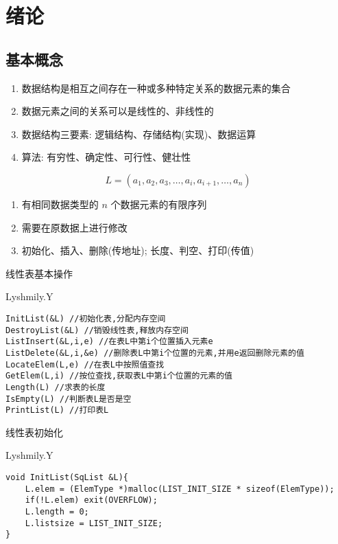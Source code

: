 \chapter{绪论}
\section{基本概念}
\begin{definition}[数据结构]
    \begin{enumerate}
        \item 数据结构是相互之间存在一种或多种特定关系的数据元素的集合
        \item 数据元素之间的关系可以是线性的、非线性的
        \item 数据结构三要素: 逻辑结构、存储结构(实现)、数据运算
        \item 算法: 有穷性、确定性、可行性、健壮性
    \end{enumerate}
\end{definition}
\begin{definition}[线性表]
    $$L=(a_{1},a_{2},a_{3},\dots,a_{i},a_{i+1},\dots,a_{n})$$
    \begin{enumerate}
        \item 有相同数据类型的 $n$ 个数据元素的有限序列
        \item 需要在原数据上进行修改
        \item 初始化、插入、删除(传地址); 长度、判空、打印(传值)
    \end{enumerate}
\end{definition}
线性表基本操作
\begin{macbox}{Lyshmily.Y}
    \begin{verbatim}
InitList(&L) //初始化表,分配内存空间
DestroyList(&L) //销毁线性表,释放内存空间
ListInsert(&L,i,e) //在表L中第i个位置插入元素e
ListDelete(&L,i,&e) //删除表L中第i个位置的元素,并用e返回删除元素的值
LocateElem(L,e) //在表L中按照值查找
GetElem(L,i) //按位查找,获取表L中第i个位置的元素的值 
Length(L) //求表的长度
IsEmpty(L) //判断表L是否是空
PrintList(L) //打印表L
    \end{verbatim}
\end{macbox}

线性表初始化
\begin{macbox}{Lyshmily.Y}
    \begin{verbatim}
void InitList(SqList &L){
    L.elem = (ElemType *)malloc(LIST_INIT_SIZE * sizeof(ElemType));
    if(!L.elem) exit(OVERFLOW);
    L.length = 0;
    L.listsize = LIST_INIT_SIZE;
}
    \end{verbatim}
\end{macbox}